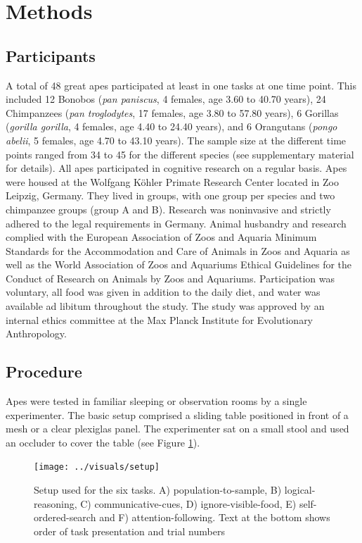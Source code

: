 \documentclass[
  man,floatsintext]{apa6}
\begin{document}
\hypertarget{methods}{%
\section{Methods}\label{methods}}

\hypertarget{participants}{%
\subsection{Participants}\label{participants}}

A total of 48 great apes participated at least in one tasks at one time point. This included 12 Bonobos (\emph{pan paniscus}, 4 females, age 3.60 to 40.70 years), 24 Chimpanzees (\emph{pan troglodytes}, 17 females, age 3.80 to 57.80 years), 6 Gorillas (\emph{gorilla gorilla}, 4 females, age 4.40 to 24.40 years), and 6 Orangutans (\emph{pongo abelii}, 5 females, age 4.70 to 43.10 years). The sample size at the different time points ranged from 34 to 45 for the different species (see supplementary material for details). All apes participated in cognitive research on a regular basis. Apes were housed at the Wolfgang Köhler Primate Research Center located in Zoo Leipzig, Germany. They lived in groups, with one group per species and two chimpanzee groups (group A and B). Research was noninvasive and strictly adhered to the legal requirements in Germany. Animal husbandry and research complied with the European Association of Zoos and Aquaria Minimum Standards for the Accommodation and Care of Animals in Zoos and Aquaria as well as the World Association of Zoos and Aquariums Ethical Guidelines for the Conduct of Research on Animals by Zoos and Aquariums. Participation was voluntary, all food was given in addition to the daily diet, and water was available ad libitum throughout the study. The study was approved by an internal ethics committee at the Max Planck Institute for Evolutionary Anthropology.

\hypertarget{procedure}{%
\subsection{Procedure}\label{procedure}}

Apes were tested in familiar sleeping or observation rooms by a single experimenter. The basic setup comprised a sliding table positioned in front of a mesh or a clear plexiglas panel. The experimenter sat on a small stool and used an occluder to cover the table (see Figure \ref{fig:setup}).

\begin{figure}
\texttt{[image: ../visuals/setup]} \caption{Setup used for the six tasks. A) population-to-sample, B) logical-reasoning, C) communicative-cues, D) ignore-visible-food, E) self-ordered-search and F) attention-following. Text at the bottom shows order of task presentation and trial numbers}\label{fig:setup}
\end{figure}
\end{document}
